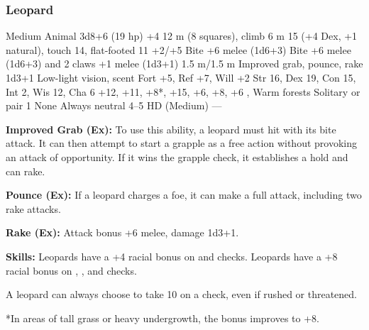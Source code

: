 \subsubsection{Leopard}
\begin{MonsterStats}
{Medium Animal}
{3d8+6 (19 hp)}
{+4}
{12 m (8 squares), climb 6 m}
{15 (+4 Dex, +1 natural), touch 14, flat-footed 11}
{+2/+5}
{Bite +6 melee (1d6+3)}
{Bite +6 melee (1d6+3) and 2 claws +1 melee (1d3+1)}
{1.5 m/1.5 m}
{Improved grab, pounce, rake 1d3+1}
{Low-light vision, scent}
{Fort +5, Ref +7, Will +2}
{Str 16, Dex 19, Con 15, Int 2, Wis 12, Cha 6}
{
     +12, %
     +11, %
     +8*, %
     +15, %
     +6, %
     +8, %
     +6} %
{, }
{Warm forests}
{Solitary or pair}
{1}
{None}
{Always neutral}
{4--5 HD (Medium)}
{---}
\end{MonsterStats}


\textbf{Improved Grab (Ex):} To use this ability, a leopard must hit with its bite attack. It can then attempt to start a grapple as a free action without provoking an attack of opportunity. If it wins the grapple check, it establishes a hold and can rake.

\textbf{Pounce (Ex):} If a leopard charges a foe, it can make a full attack, including two rake attacks.

\textbf{Rake (Ex):} Attack bonus +6 melee, damage 1d3+1.

\textbf{Skills:} Leopards have a +4 racial bonus on  and  checks. Leopards have a +8 racial bonus on , , and  checks.

A leopard can always choose to take 10 on a  check, even if rushed or threatened.

*In areas of tall grass or heavy undergrowth, the  bonus improves to +8.

